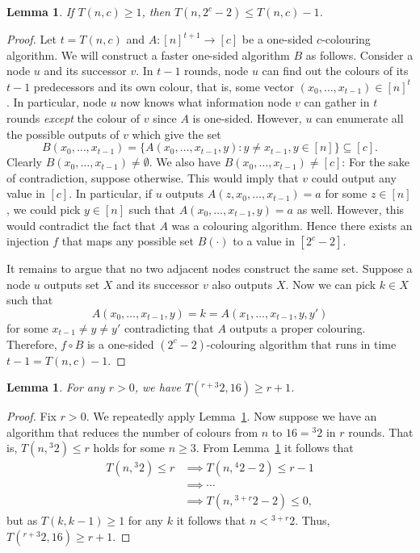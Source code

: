 \documentclass[a4paper,11pt]{article}
\newtheorem{lemma}[theorem]{Lemma}
\theoremstyle{remark}
\newcommand{\pt}[1]{{}^{#1}2} \newcommand{\nh}{\sim} \DeclareMathOperator{\indeg}{in-deg}
\begin{document}
\begin{lemma}\label{lemma:speedup}
 If $T(n,c) \ge 1$, then $T(n, 2^c-2) \le T(n,c) - 1$.
\end{lemma}
\begin{proof}
 Let $t = T(n,c)$ and $A \colon [n]^{t+1} \to [c]$ be a one-sided $c$-colouring algorithm. We will construct a faster one-sided algorithm $B$ as follows. Consider a node $u$ and its successor $v$. In $t-1$ rounds, node $u$ can find out the colours of its $t-1$ predecessors and its own colour, that is, some vector $(x_0, \dots, x_{t-1}) \in [n]^t$. In particular, node $u$ now knows what information node $v$ can gather in $t$ rounds \emph{except} the colour of $v$ since $A$ is one-sided. However, $u$ can enumerate all the possible outputs of $v$ which give the set
\[
 B(x_0, \dots, x_{t-1}) = \bigl\{ A(x_0, \dots, x_{t-1}, y) \colon y \neq x_{t-1}, y \in [n]\bigr\} \subseteq [c].
\]
Clearly $B(x_0, \dots, x_{t-1}) \ne \emptyset$. We also have $B(x_0, \dots, x_{t-1}) \ne [c]$: For the sake of contradiction, suppose otherwise. This would imply that $v$ could output any value in $[c]$. In particular, if $u$ outputs $A(z, x_0, \dots, x_{t-1}) = a$ for some $z \in [n]$, we could pick $y \in [n]$ such that $A(x_0, \dots, x_{t-1}, y) = a$ as well. However, this would contradict the fact that $A$ was a colouring algorithm. Hence there exists an injection $f$ that maps any possible set $B(\cdot)$ to a value in $[2^c-2]$. 

It remains to argue that no two adjacent nodes construct the same set. Suppose a node $u$ outputs set $X$ and its successor $v$ also outputs $X$. Now we can pick $k \in X$ such that 
\[
 A(x_0, \dots, x_{t-1}, y) = k = A(x_1, \dots, x_{t-1}, y, y')
\]
for some $x_{t-1} \neq y \neq y'$ contradicting that $A$ outputs a proper colouring. Therefore, $f \circ B$ is a one-sided $(2^c-2)$-colouring algorithm that runs in time $t-1 = T(n,c) - 1$.
\end{proof}

\begin{lemma}\label{lemma:rounds}
For any $r>0$, we have $T(\pt{r+3}, 16) \ge r+1$.
\end{lemma}
\begin{proof}
Fix $r>0$. We repeatedly apply Lemma~\ref{lemma:speedup}. Now suppose we have an algorithm that reduces the number of colours from $n$ to $16=\pt{3}$ in $r$ rounds. That is, $T(n, \pt{3}) \le r$ holds for some $n\ge3$. From Lemma~\ref{lemma:speedup} it follows that
\begin{align*}
T(n, \pt{3}) \le r &\implies T(n, \pt{4}-2) \le r - 1 \\
                   &\implies \cdots \\
                   &\implies T(n, \pt{3+r}-2) \le 0,
\end{align*}
but as $T(k,k-1) \ge 1$ for any $k$ it follows that $n < \pt{3+r}$. Thus, $T(\pt{r+3},16) \ge r +1$.
\end{proof}
\end{document}

